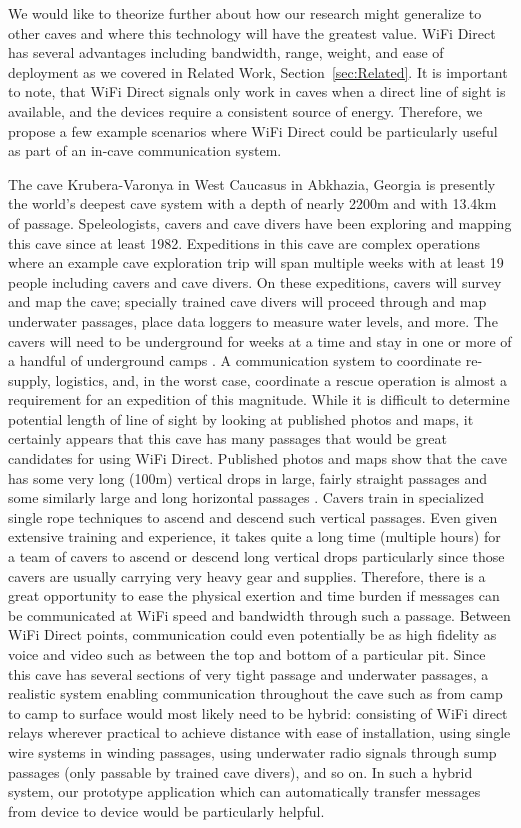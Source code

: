 \documentclass[10pt,twocolumn]{article}
\begin{document}
We would like to theorize further about how our research might generalize to other caves and where this technology will have the greatest value.
WiFi Direct has several advantages including bandwidth, range, weight, and ease of deployment as we covered in Related Work, Section~\ref{sec:Related}.
It is important to note, that WiFi Direct signals only work in caves when a direct line of sight is available, and the devices require a consistent source of energy.
Therefore, we propose a few example scenarios where WiFi Direct could be particularly useful as part of an in-cave communication system.

The cave Krubera-Varonya in West Caucasus in Abkhazia, Georgia is presently the world's deepest cave system with a depth of nearly 2200m and with 13.4km of passage. 
Speleologists, cavers and cave divers have been exploring and mapping this cave since at least 1982.
Expeditions in this cave are complex operations where an example cave exploration trip will span multiple weeks with at least 19 people including cavers and cave divers.
On these expeditions, cavers will survey and map the cave; specially trained cave divers will proceed through and map underwater passages, place data loggers to measure water levels, and more.
The cavers will need to be underground for weeks at a time and stay in one or more of a handful of underground camps \cite{krub_it}.
A communication system to coordinate re-supply, logistics, and, in the worst case, coordinate a rescue operation is almost a requirement for an expedition of this magnitude.
While it is difficult to determine potential length of line of sight by looking at published photos and maps, 
it certainly appears that this cave has many passages that would be great candidates for using WiFi Direct.
Published photos and maps show that the cave has some very long (100m) vertical drops in large, fairly straight passages and some similarly large and long horizontal passages \cite{krub_it}.
Cavers train in specialized single rope techniques to ascend and descend such vertical passages.
Even given extensive training and experience, it takes quite a long time (multiple hours) for a team of cavers to ascend or descend long vertical drops particularly since those cavers are usually carrying very heavy gear and supplies.
Therefore, there is a great opportunity to ease the physical exertion and time burden if messages can be communicated at WiFi speed and bandwidth through such a passage.
Between WiFi Direct points, communication could even potentially be as high fidelity as voice and video such as between the top and bottom of a particular pit.
Since this cave has several sections of very tight passage and underwater passages,
a realistic system enabling communication throughout the cave such as from camp to camp to surface would most likely need to be hybrid:
consisting of WiFi direct relays wherever practical to achieve distance with ease of installation, using single wire systems in winding passages, using underwater radio signals through sump passages (only passable by trained cave divers), and so on.
In such a hybrid system, our prototype application which can automatically transfer messages from device to device would be particularly helpful.
\end{document}
